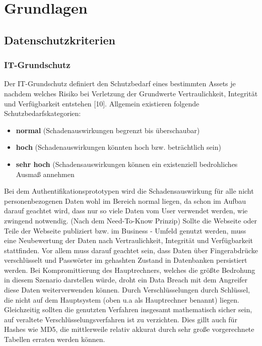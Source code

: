\chapter{Grundlagen}

\section{Datenschutzkriterien}
\subsection{IT-Grundschutz}
Der IT-Grundschutz definiert den Schutzbedarf eines bestimmten Assets je nachdem welches Risiko bei Verletzung der Grundwerte Vertraulichkeit, Integrität und Verfügbarkeit entstehen [10]. Allgemein existieren folgende Schutzbedarfskategorien:
\begin{itemize} 
\item \textbf{normal} (Schadenauswirkungen begrenzt bis überschaubar)
\item \textbf{hoch} (Schadenauswirkungen könnten hoch bzw. beträchtlich sein)
\item \textbf{sehr hoch} (Schadensauswirkungen können ein existenziell bedrohliches Ausmaß annehmen
\end{itemize}
Bei dem Authentifikationsprototypen wird die Schadensauswirkung für alle nicht personenbezogenen Daten wohl im Bereich normal liegen, da schon im Aufbau darauf geachtet wird, dass nur so viele Daten vom User verwendet werden, wie zwingend notwendig. (Nach dem Need-To-Know Prinzip) Sollte die Webseite oder Teile der Webseite publiziert bzw. im Business - Umfeld genutzt werden, muss eine Neubewertung der Daten nach Vertraulichkeit, Integrität und Verfügbarkeit stattfinden. Vor allem muss darauf geachtet sein, dass Daten über Fingerabdrücke verschlüsselt und Passwörter im gehashten Zustand in Datenbanken persistiert werden. Bei Kompromittierung des Hauptrechners, welches die größte Bedrohung in diesem Szenario darstellen würde, droht ein Data Breach mit dem Angreifer diese Daten weiterverwenden können. Durch Verschlüsselungen durch Schlüssel, die nicht auf dem Hauptsystem (oben u.a als Hauptrechner benannt) liegen. Gleichzeitig sollten die genutzten Verfahren insgesamt mathematisch sicher sein, auf veraltete Verschlüsselungsverfahren ist zu verzichten. Dies gillt auch für Hashes wie MD5, die mittlerweile relativ akkurat durch sehr große vorgerechnete Tabellen erraten werden können. \newpage

